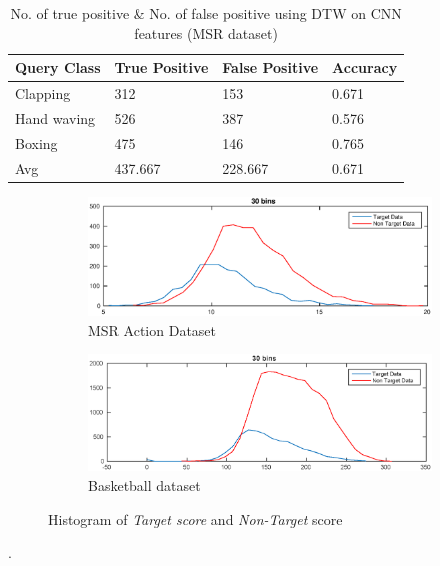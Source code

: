 \begin{table}[ht]
\caption[Event classification using DTW on CNN features (MSR Action Dataset \RN{2}) ]{No. of true positive \& No. of false positive using DTW on CNN features (MSR dataset)}
\label{table:cnn_dtw_res_msr}
\centering
\begin{tabular}{|l|l|l|l|}
\hline
Query Class & True Positive & False Positive & Accuracy \\ \hline
Clapping    &312	&153	&0.671\\
Hand waving &526	&387	&0.576\\
Boxing      &475	&146	&0.765\\
\hline
Avg	&437.667	&228.667	&0.671\\
\hline  
\end{tabular}
\end{table} 
\pagebreak
\begin{figure}[ht]
        \centering
        \begin{subfigure}[b]{0.9\textwidth}
        		\centering
        		\includegraphics[width=\textwidth]{./imgs/MSR_DTW.eps}
        		\caption{MSR Action Dataset}
        \end{subfigure}
        
        \begin{subfigure}[b]{0.9\textwidth}
        			\centering
                \includegraphics[width=\textwidth]{./imgs/Basket_DTW.eps}
                \caption{Basketball dataset}
        \end{subfigure}
        \caption{Histogram of \textit{Target score} and \textit{Non-Target} score}
        \label{fig:dtw_score}
\end{figure}.

